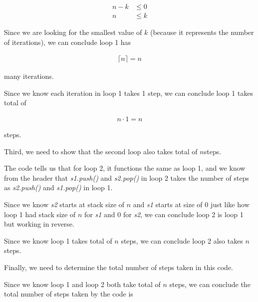 \documentclass[12pt]{article}
\begin{document}
\begin{enumerate}[a.]
\begin{mdframed}
    \setcounter{equation}{0}
    \begin{align}
        n - k &\leq 0\\
        n &\leq k
    \end{align}

    \bigskip

    Since we are looking for the smallest value of $k$ (because it represents
    the number of iterations), we can conclude loop 1 has

    \begin{align}
        \lceil n \rceil = n
    \end{align}

    many iterations.

    \bigskip

    Since we know each iteration in loop 1 takes 1 step, we can conclude
    loop 1 takes total of

    \begin{align}
        n \cdot 1 = n
    \end{align}

    steps.

    \bigskip

    Third, we need to show that the second loop also takes total of \color{red}$n$\color{black}\:steps.

    \bigskip
    \color{red}
    The code tells us that for loop 2, it functions the same as loop 1, and we
    know from the header that \textit{s1.push()} and \textit{s2.pop()} in loop 2
    takes the number of steps as \textit{s2.push()} and \textit{s1.pop()} in loop 1.

    \bigskip

    Since we know \textit{s2} starts at stack size of $n$ and \textit{s1} starts at size of 0
    just like how loop 1 had stack size of $n$ for \textit{s1} and
    0 for \textit{s2}, we can conclude loop 2 is loop 1 but working in reverse.

    \bigskip

    Since we know loop 1 takes total of $n$ steps, we can conclude loop 2
    also takes $n$ steps.
    \color{black}
    \bigskip

    Finally, we need to determine the total number of steps taken in this code.

    \bigskip

    Since we know \color{red}loop 1 and loop 2 both take total of $n$
    steps\color{black}, we can conclude the total number of steps taken by
    the code is


\end{mdframed}
\end{enumerate}
\end{document}
